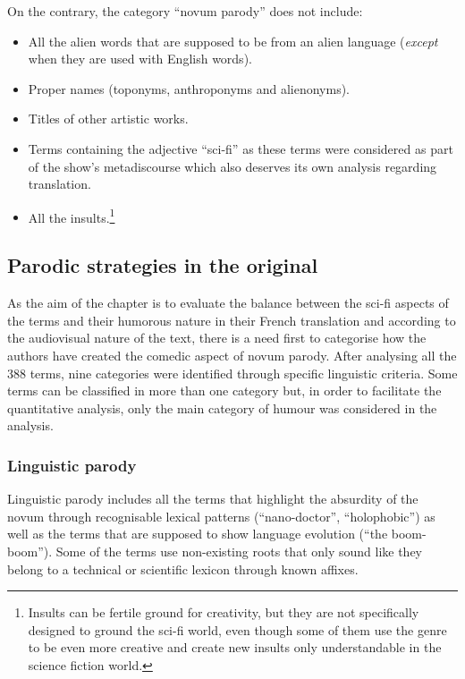 \documentclass[output=paper]{langscibook}
\begin{document}
On the contrary, the category “novum parody” does not include:

\begin{itemize}
\item All the alien words that are supposed to be from an alien language (\textit{except} when they are used with English words).
\item Proper names (toponyms, anthroponyms and alienonyms).
\item Titles of other artistic works.
\item Terms containing the adjective “sci-fi” as these terms were considered as part of the show’s metadiscourse which also deserves its own analysis regarding translation.
\item All the insults.\footnote{Insults can be fertile ground for creativity, but they are not specifically designed to ground the sci-fi world, even though some of them use the genre to be even more creative and create new insults only understandable in the science fiction world.}
\end{itemize}

\subsection{Parodic strategies in the original}

\label{bkm:Ref155259883}

As the aim of the chapter is to evaluate the balance between the sci-fi aspects of the terms and their humorous nature in their French translation and according to the audiovisual nature of the text, there is a need first to categorise how the authors have created the comedic aspect of novum parody. After analysing all the 388 terms, nine categories were identified through specific linguistic criteria. Some terms can be classified in more than one category but, in order to facilitate the quantitative analysis, only the main category of humour was considered in the analysis.

\subsubsection{Linguistic parody}

Linguistic parody includes all the terms that highlight the absurdity of the novum through recognisable lexical patterns (“nano-doctor”, “holophobic”) as well as the terms that are supposed to show language evolution (“the boom-boom”). Some of the terms use non-existing roots that only sound like they belong to a technical or scientific lexicon through known affixes.
\end{document}
